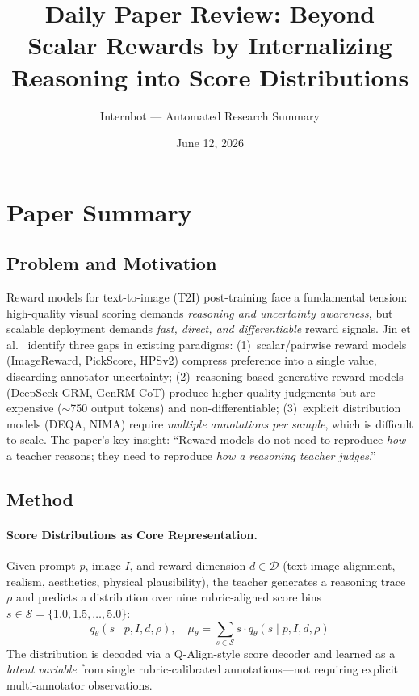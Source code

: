 \documentclass[11pt,a4paper]{article}
\title{Daily Paper Review: Beyond Scalar Rewards by Internalizing\\Reasoning into Score Distributions}
\author{Internbot --- Automated Research Summary}
\date{June 12, 2026}
\begin{document}
\maketitle

\section{Paper Summary}

\subsection{Problem and Motivation}

Reward models for text-to-image (T2I) post-training face a fundamental tension: high-quality visual scoring demands \emph{reasoning and uncertainty awareness}, but scalable deployment demands \emph{fast, direct, and differentiable} reward signals. Jin et al.~\cite{jin2026zreward} identify three gaps in existing paradigms: (1)~scalar/pairwise reward models (ImageReward, PickScore, HPSv2) compress preference into a single value, discarding annotator uncertainty; (2)~reasoning-based generative reward models (DeepSeek-GRM, GenRM-CoT) produce higher-quality judgments but are expensive ($\sim$750 output tokens) and non-differentiable; (3)~explicit distribution models (DEQA, NIMA) require \emph{multiple annotations per sample}, which is difficult to scale. The paper's key insight: ``Reward models do not need to reproduce \emph{how} a teacher reasons; they need to reproduce \emph{how a reasoning teacher judges}.''

\subsection{Method}

\paragraph{Score Distributions as Core Representation.} Given prompt $p$, image $I$, and reward dimension $d \in \mathcal{D}$ (text-image alignment, realism, aesthetics, physical plausibility), the teacher generates a reasoning trace $\rho$ and predicts a distribution over nine rubric-aligned score bins $s \in \mathcal{S} = \{1.0, 1.5, \ldots, 5.0\}$:
\begin{equation}
q_\theta(s \mid p, I, d, \rho), \quad \mu_\theta = \textstyle\sum_{s \in \mathcal{S}} s \cdot q_\theta(s \mid p, I, d, \rho)
\end{equation}
The distribution is decoded via a Q-Align-style score decoder and learned as a \emph{latent variable} from single rubric-calibrated annotations---not requiring explicit multi-annotator observations.
\end{document}
